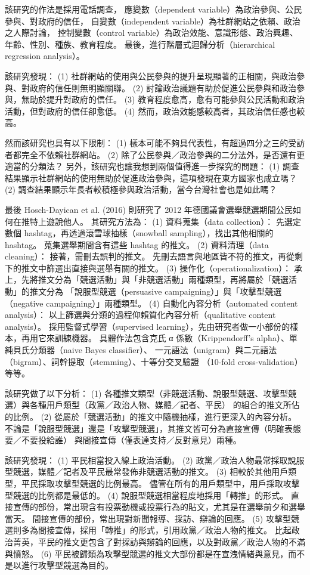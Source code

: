 \documentclass[letterpaper, 10pt, conference]{ieeeconf}   %
\begin{document}
\begin{CJK}{UTF8}{bsmi}
該研究的作法是採用電話調查，
應變數（dependent variable）為政治參與、公民參與、對政府的信任，
自變數（independent variable）為社群網站之依賴、政治之人際討論，
控制變數（control variable）為政治效能、意識形態、政治興趣、年齡、性別、種族、教育程度。
最後，進行階層式迴歸分析（hierarchical regression analysis）。

該研究發現：
 (1) 社群網站的使用與公民參與的提升呈現顯著的正相關，與政治參與、對政府的信任則無明顯關聯。
 (2) 討論政治議題有助於促進公民參與和政治參與，無助於提升對政府的信任。
 (3) 教育程度愈高，愈有可能參與公民活動和政治活動，但對政府的信任卻愈低。
 (4) 然而，政治效能感較高者，其政治信任感也較高。

然而該研究也具有以下限制：
 (1) 樣本可能不夠具代表性，有超過四分之三的受訪者都完全不依賴社群網站。
 (2) 除了公民參與／政治參與的二分法外，是否還有更適當的分類法？
另外，該研究也讓我想到兩個值得進一步探究的問題：
 (1) 調查結果顯示社群網站的使用無助於促進政治參與，這項發現在東方國家也成立嗎？
 (2) 調查結果顯示年長者較積極參與政治活動，當今台灣社會也是如此嗎？

最後 Hosch-Dayican et al. (2016) 則研究了 2012 年德國議會選舉競選期間公民如何在推特上遊說他人。\cite{c3}
其研究方法為：
 (1) 資料蒐集（data collection）：
先選定數個 hashtag，再透過滾雪球抽樣（snowball sampling），找出其他相關的 hashtag。
蒐集選舉期間含有這些 hashtag 的推文。
 (2) 資料清理（data cleaning）：
接著，需刪去誤判的推文。
先刪去語言與地區皆不符的推文，再從剩下的推文中篩選出直接與選舉有關的推文。
 (3) 操作化（operationalization）：
承上，先將推文分為「競選活動」與「非競選活動」兩種類型，再將屬於「競選活動」的推文分為
「說服型競選（persuasive campaigning）」與「攻擊型競選（negative campaigning）」兩種類型。
 (4) 自動化內容分析（automated content analysis）：
以上篩選與分類的過程仰賴質化內容分析（qualitative content analysis）。
採用監督式學習（supervised learning），先由研究者做一小部份的樣本，再用它來訓練機器。
具體作法包含克氏 α 係數（Krippendorff's alpha）、單純貝氏分類器（naive Bayes classifier）、
一元語法（unigram）與二元語法（bigram）、詞幹提取（stemming）、十等分交叉驗證
（10-fold cross-validation）等等。

該研究做了以下分析：
 (1) 各種推文類型（非競選活動、說服型競選、攻擊型競選）與各種用戶類型（政黨／政治人物、媒體／記者、平民）
的組合的推文所佔的比例。
 (2) 從屬於「競選活動」的推文中隨機抽樣，進行更深入的內容分析。
不論是「說服型競選」還是「攻擊型競選」，其推文皆可分為直接宣傳（明確表態要／不要投給誰）
與間接宣傳（僅表達支持／反對意見）兩種。

該研究發現：
 (1) 平民相當投入線上政治活動。
 (2) 政黨／政治人物最常採取說服型競選，媒體／記者及平民最常發佈非競選活動的推文。
 (3) 相較於其他用戶類型，平民採取攻擊型競選的比例最高。
儘管在所有的用戶類型中，用戶採取攻擊型競選的比例都是最低的。
 (4) 說服型競選相當程度地採用「轉推」的形式。
直接宣傳的部份，常出現含有投票動機或投票行為的貼文，尤其是在選舉前夕和選舉當天。
間接宣傳的部份，常出現對新聞報導、採訪、辯論的回應。
 (5) 攻擊型競選則多為間接宣傳，採用「轉推」的形式，引用政黨／政治人物的推文。
比起政治菁英，平民的推文更包含了對採訪與辯論的回應，以及對政黨／政治人物的不滿與憤怒。
 (6) 平民被歸類為攻擊型競選的推文大部份都是在宣洩情緒與意見，而不是以進行攻擊型競選為目的。


\end{CJK}
\end{document}
